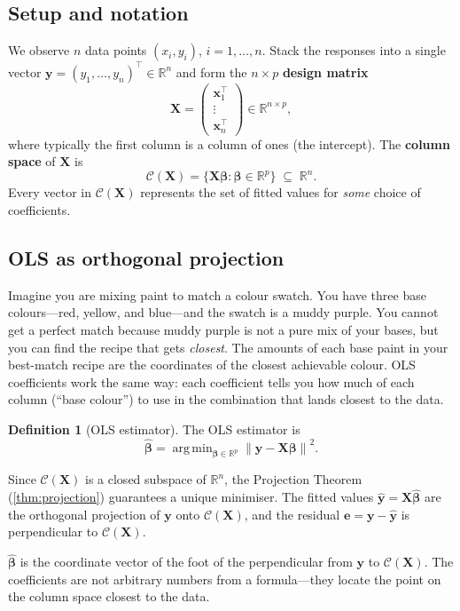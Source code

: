 \documentclass[11pt,a4paper]{article}
\theoremstyle{plain}
\theoremstyle{definition}
\newtheorem{definition}[theorem]{Definition}
\newcommand{\R}{\mathbb{R}}
\newcommand{\yhat}{\hat{\bm{y}}}
\newcommand{\bhat}{\hat{\bm{\beta}}}
\newcommand{\bX}{\bm{X}}
\newcommand{\by}{\bm{y}}
\newcommand{\be}{\bm{e}}
\newcommand{\Col}{\mathcal{C}}
\newcommand{\norm}[1]{\left\lVert #1 \right\rVert}
\DeclareMathOperator*{\argmin}{arg\,min}
\begin{document}
\subsection{Setup and notation}

We observe $n$ data points $(x_i, y_i)$, $i=1,\dots,n$.
Stack the responses into a single vector
$\by = (y_1,\dots,y_n)^\top \in \R^n$ and form the
$n\times p$ \textbf{design matrix}
\[
  \bX = \begin{pmatrix} \bm{x}_1^\top \\ \vdots \\ \bm{x}_n^\top \end{pmatrix}
  \in \R^{n\times p},
\]
where typically the first column is a column of ones (the intercept).
The \textbf{column space} of $\bX$ is
\[
  \Col(\bX) = \bigl\{\bX\bm{\beta} : \bm{\beta}\in\R^p\bigr\}
  \;\subseteq\; \R^n.
\]
Every vector in $\Col(\bX)$ represents the set of fitted values for
\emph{some} choice of coefficients.

\subsection{OLS as orthogonal projection}

\begin{toystory}
Imagine you are mixing paint to match a colour swatch.
You have three base colours---red, yellow, and blue---and the swatch
is a muddy purple.  You cannot get a perfect match because muddy
purple is not a pure mix of your bases, but you can find the recipe
that gets \emph{closest}.  The amounts of each base paint in your
best-match recipe are the coordinates of the closest achievable colour.
OLS coefficients work the same way: each coefficient tells you how much
of each column (``base colour'') to use in the combination that lands
closest to the data.
\end{toystory}

\begin{definition}[OLS estimator]
The OLS estimator is
\[
  \bhat = \argmin_{\bm{\beta}\in\R^p}
  \norm{\by - \bX\bm{\beta}}^2.
\]
\end{definition}

Since $\Col(\bX)$ is a closed subspace of $\R^n$, the Projection Theorem
(\ref{thm:projection}) guarantees a unique minimiser.
The fitted values $\yhat = \bX\bhat$ are the orthogonal projection of $\by$
onto $\Col(\bX)$, and the residual
$\be = \by - \yhat$
is perpendicular to $\Col(\bX)$.

\begin{keyinsight}
$\bhat$ is the coordinate vector of the foot of the perpendicular
from $\by$ to $\Col(\bX)$.
The coefficients are not arbitrary numbers from a formula---they locate
the point on the column space closest to the data.
\end{keyinsight}
\end{document}
